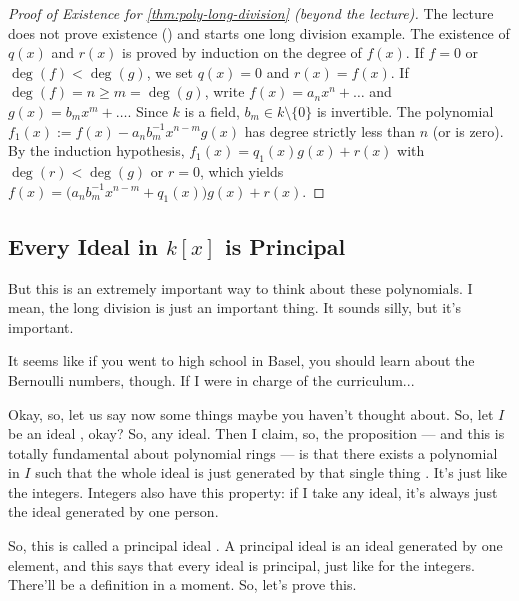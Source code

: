 \begin{content}
\begin{proof}[Proof of Existence for \cref{thm:poly-long-division} (beyond the lecture)]
The lecture does not prove existence () and starts one long division example. The existence of $q(x)$ and $r(x)$ is proved by induction on the degree of $f(x)$. If $f = 0$ or $\deg(f) < \deg(g)$, we set $q(x) = 0$ and $r(x) = f(x)$. If $\deg(f) = n \ge m = \deg(g)$, write $f(x) = a_n x^n + \dots$ and $g(x) = b_m x^m + \dots$. Since $k$ is a field, $b_m \in k \setminus \{0\}$ is invertible. The polynomial $f_1(x) := f(x) - a_n b_m^{-1} x^{n-m} g(x)$ has degree strictly less than $n$ (or is zero). By the induction hypothesis, $f_1(x) = q_1(x) g(x) + r(x)$ with $\deg(r) < \deg(g)$ or $r = 0$, which yields $f(x) = \bigl(a_n b_m^{-1} x^{n-m} + q_1(x)\bigr) g(x) + r(x)$.
\end{proof}
\end{content}

\subsection{Every Ideal in \texorpdfstring{$k[x]$}{k[x]} is Principal}

\begin{speech}[00:30:47 - 00:32:22]
But this is an extremely important way to think about these polynomials. I mean, the long division is just an important thing. It sounds silly, but it's important.

It seems like if you went to high school in Basel, you should learn about the Bernoulli numbers, though. If I were in charge of the curriculum... 

Okay, so, let us say now some things maybe you haven't thought about. So, let $I$ be an ideal , okay? So, any ideal. Then I claim, so, the proposition --- and this is totally fundamental about polynomial rings --- is that there exists a polynomial in $I$  such that the whole ideal is just generated by that single thing . It's just like the integers. Integers also have this property: if I take any ideal, it's always just the ideal generated by one person.

So, this is called a principal ideal . A principal ideal is an ideal generated by one element, and this says that every ideal is principal, just like for the integers. There'll be a definition in a moment. So, let's prove this.
\end{speech}

